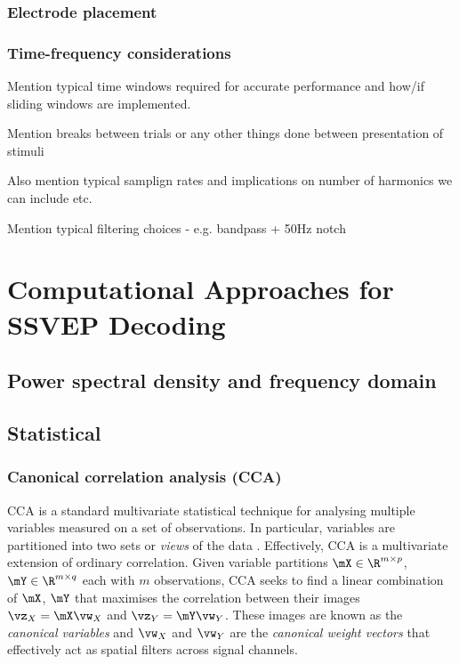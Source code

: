 \subsubsection{Electrode placement}

\subsubsection{Time-frequency considerations}
\label{subsection:time-frequency-considerations-c2}
Mention typical time windows required for accurate performance and how/if sliding windows are implemented. 

Mention breaks between trials or any other things done between presentation of stimuli

Also mention typical samplign rates and implications on number of harmonics we can include etc. 

Mention typical filtering choices - e.g. bandpass + 50Hz notch

\section{Computational Approaches for SSVEP Decoding}
\subsection{Power spectral density and frequency domain}
\subsection{Statistical}

\subsubsection{Canonical correlation analysis (CCA)}
\label{subsection:CCA-c2}
CCA is a standard multivariate statistical technique for analysing multiple variables measured on a set of observations. In particular, variables are partitioned into two sets or \textit{views} of the data \cite{cca-tutorial}. Effectively, CCA is a multivariate extension of ordinary correlation. Given variable partitions $\mX \in \R^{m\times p}$, $\mY \in \R^{m\times q}$ each with $m$ observations, CCA seeks to find a linear combination of $\mX$, $\mY$ that maximises the correlation between their images $\vz_X = \mX\vw_X$ and $\vz_Y = \mY\vw_Y$. These images are known as the \textit{canonical variables} and $\vw_X$ and $\vw_Y$ are the \textit{canonical weight vectors} that effectively act as spatial filters across signal channels.

